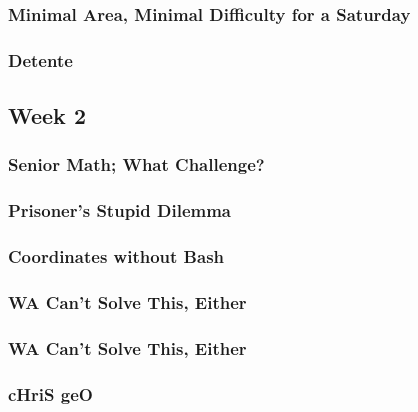 \documentclass[titlepage=true]{scrartcl}
\begin{document}
	\subsubsection{Minimal Area, Minimal Difficulty for a Saturday}
	\label{15.1.6}
	
	\newpage

	\subsubsection{Detente}
	\label{15.1.7}
	
	\newpage
    
    \subsection{Week 2}
    
    \subsubsection{Senior Math; What Challenge?}
	\label{15.2.1}
	
	\newpage

	\subsubsection{Prisoner's Stupid Dilemma}
	\label{15.2.2}
	
	\newpage

	\subsubsection{Coordinates without Bash}
	\label{15.2.3}
	
	\newpage

	\subsubsection{WA Can't Solve This, Either}
	\label{15.2.4}
	
	\newpage

	\subsubsection{WA Can't Solve This, Either}
	\label{15.2.5}
	
	\newpage

	\subsubsection{cHriS geO}
	\label{15.2.6}
	
	\newpage
\end{document}
